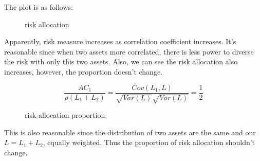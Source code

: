\documentclass[letterpaper,11pt]{article}
\begin{document}
\begin{spacing}{1.2}
The plot is as follows:
\begin{figure}[htbp]        
 \caption{\label{2} risk allocation}      
 \end{figure}

Apparently, risk measure increases as correlation coefficient increases. It's reasonable since when two assets more correlated, there is less power to diverse the risk with only this two assets. Also, we can see the risk allocation also increases, however, the proportion doesn't change.

$$
\frac{AC_1}{\rho(L_1+L_2)} = \frac{Cov(L_1,L)}{\sqrt{Var(L)}\sqrt{Var(L)}} = \frac{1}{2}
$$

\begin{figure}[htbp]        
 \caption{\label{2} risk allocation proportion}      
 \end{figure}

This is also reasonable since the distribution of two assets are the same and our $L = L_1 + L_2$, equally weighted. Thus the proportion of risk allocation shouldn't change.


\end{spacing}
\end{document}
